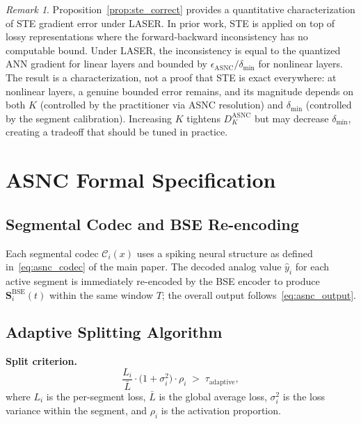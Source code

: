 \documentclass{article}
\theoremstyle{plain}
\theoremstyle{definition}
\theoremstyle{remark}
\newtheorem{remark}[theorem]{Remark}
\begin{document}
\begin{remark}
Proposition~\ref{prop:ste_correct} provides a quantitative characterization of STE
gradient error under LASER. In prior work, STE is applied on top of lossy
representations where the forward-backward inconsistency has no computable bound.
Under LASER, the inconsistency is equal to the quantized ANN gradient for linear
layers and bounded by $\epsilon_{\mathrm{ASNC}} / \delta_{\min}$ for nonlinear
layers. The result is a characterization, not a proof that STE is exact everywhere:
at nonlinear layers, a genuine bounded error remains, and its magnitude depends on
both $K$ (controlled by the practitioner via ASNC resolution) and $\delta_{\min}$
(controlled by the segment calibration). Increasing $K$ tightens $D_K^{\mathrm{ASNC}}$
but may decrease $\delta_{\min}$, creating a tradeoff that should be tuned in
practice.
\end{remark}


\section{ASNC Formal Specification}
\label{app:asnc_details}

\subsection{Segmental Codec and BSE Re-encoding}

Each segmental codec $\mathcal{C}_i(x)$ uses a spiking neural structure as defined
in~\eqref{eq:asnc_codec} of the main paper. The decoded analog value $\hat{y}_i$ for
each active segment is immediately re-encoded by the BSE encoder to produce
$\mathbf{S}^{\mathrm{BSE}}_i(t)$ within the same window $T$; the overall output
follows~\eqref{eq:asnc_output}.

\subsection{Adaptive Splitting Algorithm}

\noindent\textbf{Split criterion.}
\begin{equation}
\frac{L_i}{\bar{L}} \cdot \big(1 + \sigma_i^2\big) \cdot \rho_i
\;>\; \tau_{\mathrm{adaptive}},
\end{equation}
where $L_i$ is the per-segment loss, $\bar{L}$ is the global average loss,
$\sigma_i^2$ is the loss variance within the segment, and $\rho_i$ is the activation
proportion.
\end{document}
